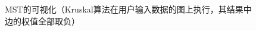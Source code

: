 \setlength{\belowcaptionskip}{-1pt}
\vspace{-7pt}
\begin{figure}[!htbp]
  \centering
  \vspace{-5pt}
  \caption{MST的可视化（Kruskal算法在用户输入数据的图上执行，其结果中边的权值全部取负）}
  \label{fig:6}
\end{figure}
